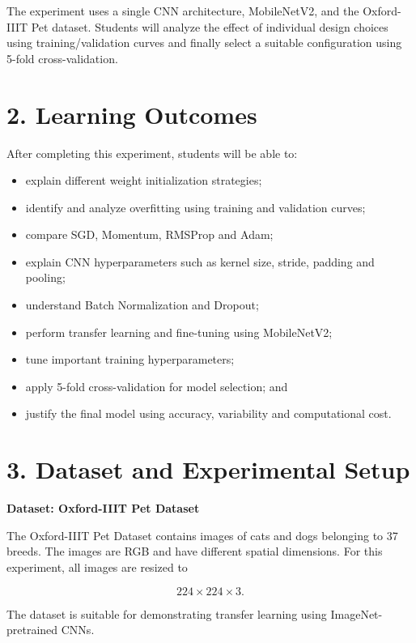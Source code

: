 \documentclass[10pt]{article}
\begin{document}
The experiment uses a single CNN architecture, MobileNetV2, and the
Oxford-IIIT Pet dataset. Students will analyze the effect of individual
design choices using training/validation curves and finally select a
suitable configuration using 5-fold cross-validation.

\section*{2. Learning Outcomes}

After completing this experiment, students will be able to:

\begin{itemize}
\item explain different weight initialization strategies;
\item identify and analyze overfitting using training and validation curves;
\item compare SGD, Momentum, RMSProp and Adam;
\item explain CNN hyperparameters such as kernel size, stride, padding and pooling;
\item understand Batch Normalization and Dropout;
\item perform transfer learning and fine-tuning using MobileNetV2;
\item tune important training hyperparameters;
\item apply 5-fold cross-validation for model selection; and
\item justify the final model using accuracy, variability and computational cost.
\end{itemize}

\section*{3. Dataset and Experimental Setup}

\textbf{Dataset: Oxford-IIIT Pet Dataset}

The Oxford-IIIT Pet Dataset contains images of cats and dogs belonging
to 37 breeds. The images are RGB and have different spatial dimensions.
For this experiment, all images are resized to

\[
224\times224\times3.
\]

The dataset is suitable for demonstrating transfer learning using
ImageNet-pretrained CNNs.
\end{document}
